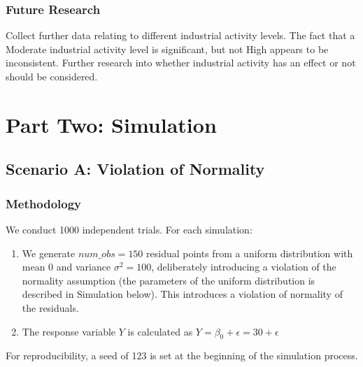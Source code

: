 \documentclass{article}
\begin{document}
\subsubsection*{Future Research}
Collect further data relating to different industrial activity levels. The fact that a Moderate industrial activity level is significant, but not High appears to be inconsistent. Further research into whether industrial activity has an effect or not should be considered.
\newpage
\section{Part Two: Simulation}
\subsection{Scenario A: Violation of Normality}
\subsubsection*{Methodology}
We conduct 1000 independent trials. For each simulation:
\begin{enumerate}
    \item We generate $num\_obs = 150$ residual points from a uniform distribution with mean 0 and variance $\sigma^2 = 100$, deliberately introducing a violation of the normality assumption (the parameters of the uniform distribution is described in Simulation below). This introduces a violation of normality of the residuals.
    \item The response variable $Y$ is calculated as $Y = \beta_0 + \epsilon = 30 + \epsilon$
\end{enumerate}
For reproducibility, a seed of 123 is set at the beginning of the simulation process.
\end{document}
